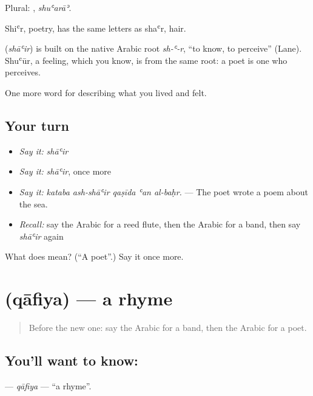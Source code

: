 Plural: , \emph{shuʿarāʾ}.

Shiʿr, poetry, has the same letters as shaʿr, hair.

\begin{cousinweb}
\textbf{} (\emph{shāʿir}) is built on the native Arabic root \emph{sh-ʿ-r}, \textquotedblleft{}to know, to perceive\textquotedblright{} (Lane). Shuʿūr, a feeling, which you know, is from the same root: a poet is one who perceives.
\end{cousinweb}

\begin{grammarlens}[title={What you've built}]
One more word for describing what you lived and felt.
\end{grammarlens}

\subsection*{Your turn}
\begin{itemize}
\raggedright
  \item \emph{Say it:} \emph{shāʿir}
  \item \emph{Say it:} \emph{shāʿir}, once more
  \item \emph{Say it:} \emph{kataba ash-shāʿir qaṣīda ʿan al-baḥr.} — The poet wrote a poem about the sea.
  \item \emph{Recall:} say the Arabic for a reed flute, then the Arabic for a band, then say \emph{shāʿir} again
\end{itemize}

\begin{tcolorbox}[breakable,colback=teal!4,colframe=teal!35!black,title={Before you move on}]
What does  mean? (\textquotedblleft{}A poet\textquotedblright{}.) Say it once more.
\end{tcolorbox}
\section[\texorpdfstring{\ar{قافية} (qāfiya)}{قافية (qāfiya)}]{ (qāfiya) — a rhyme}

\label{lesson:AR-C545-qafiya}



\begin{quote}
Before the new one: say the Arabic for a band, then the Arabic for a poet.
\end{quote}

\subsection*{You'll want to know: }
\textbf{} — \emph{qāfiya} — \textquotedblleft{}a rhyme\textquotedblright{}.

